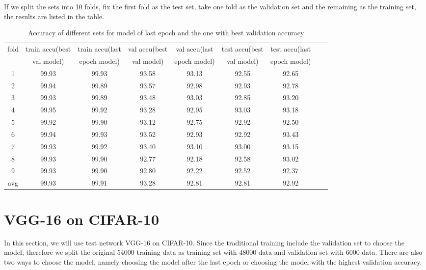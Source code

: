 If we split the sets into 10 folds, fix the first fold as the test set, take one fold as the validation set and the remaining as the training set, the results are listed in the table.
\begin{table}[!htbp]
	\centering
	\caption{Accuracy of different sets for model of last epoch and the one with best validation accuracy }
	\label{table:cv1}
	\begin{tabular}{|c|c|c|c|c|c|c|c|c|}
		\hline
%		
fold	&	train accu(best	&	train accu(last	&	val accu(best	&	val accu(last	&	test accu(best 	&	test accu(last	\\
	&	 val model)	&	 epoch model)	&	val model)	&	 epoch model)	&	val model)	&	 epoch model)	\\\hline
1	&	99.93	&	99.93	&	93.58	&	93.13	&	92.55	&	92.65	\\\hline
2	&	99.94	&	99.89	&	93.57	&	92.98	&	92.93	&	92.78	\\\hline
3	&	99.93	&	99.89	&	93.48	&	93.03	&	92.85	&	93.20	\\\hline
4	&	99.95	&	99.92	&	93.28	&	92.95	&	93.03	&	93.18	\\\hline
5	&	99.92	&	99.90	&	93.12	&	92.75	&	92.92	&	92.50	\\\hline
6	&	99.94	&	99.93	&	93.52	&	92.93	&	92.92	&	93.43	\\\hline
7	&	99.93	&	99.92	&	93.40	&	93.10	&	93.00	&	93.15	\\\hline
8	&	99.93	&	99.90	&	92.77	&	92.18	&	92.58	&	93.02	\\\hline
9	&	99.93	&	99.90	&	92.80	&	92.22	&	92.52	&	92.37	\\\hline
avg	&	99.93	&	99.91	&	93.28	&	92.81	&	92.81	&	92.92	\\\hline
	\end{tabular}
\end{table}


\newpage
\section{VGG-16 on CIFAR-10}
In this section, we will use test network VGG-16 on CIFAR-10. Since the traditional training include the validation set to choose the model, therefore we split the original 54000 training data as training set with 48000 data and validation set with 6000 data. There are also two ways to choose the model, namely choosing the model after the last epoch or choosing the model with the highest validation accuracy. 


